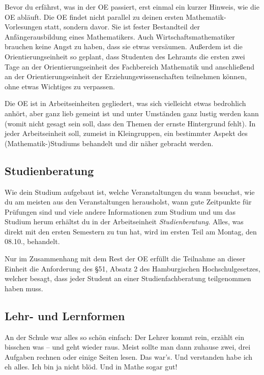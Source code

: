 Bevor du erfährst, was in der OE passiert, erst einmal ein kurzer Hinweis, wie
die OE abläuft. Die OE findet nicht parallel zu deinen ersten
Mathematik-Vorlesungen statt, sondern davor. Sie ist fester Bestandteil der
Anfängerausbildung eines Mathematikers.  Auch Wirtschaftsmathematiker brauchen
keine Angst zu haben, dass sie etwas versäumen. Außerdem ist die
Orientierungseinheit so geplant, dass Studenten des Lehramts die ersten zwei
Tage an der Orientierungseinheit des Fachbereich Mathematik und anschließend an
der Orientierungseinheit der Erziehungswissenschaften teilnehmen können, ohne
etwas Wichtiges zu verpassen.

Die OE ist in Arbeitseinheiten gegliedert, was sich vielleicht etwas bedrohlich
anhört, aber ganz lieb gemeint ist und unter Umständen ganz lustig werden kann
(womit nicht gesagt sein soll, dass den Themen der ernste Hintergrund fehlt).
In jeder Arbeitseinheit soll, zumeist in Kleingruppen, ein bestimmter Aspekt
des (Mathematik-)Studiums behandelt und dir näher gebracht werden.

\subsection*{Studienberatung}

Wie dein Studium aufgebaut ist, welche Veranstaltungen du wann besuchst, wie du
am meisten aus den Veranstaltungen herausholst, wann gute Zeitpunkte für
Prüfungen sind und viele andere Informationen zum Studium und um das Studium
herum erhältst du in der Arbeitseinheit \emph{Studienberatung}. Alles, was
direkt mit den ersten Semestern zu tun hat, wird im ersten Teil am Montag,
den 08.10., behandelt.

Nur im Zusammenhang mit dem Rest der OE erfüllt die Teilnahme an dieser Einheit
die Anforderung des \S 51, Absatz 2 des Hamburgischen Hochschulgesetzes,
welcher besagt, dass jeder Student an einer Studienfachberatung teilgenommen
haben muss.

\subsection*{Lehr- und Lernformen}

An der Schule war alles so schön einfach: Der Lehrer kommt rein, erzählt ein
bisschen was -- und geht wieder raus. Meist sollte man dann zuhause zwei, drei
Aufgaben rechnen oder einige Seiten lesen. Das war's. Und verstanden habe ich
eh alles. Ich bin ja nicht blöd. Und in Mathe sogar gut!

